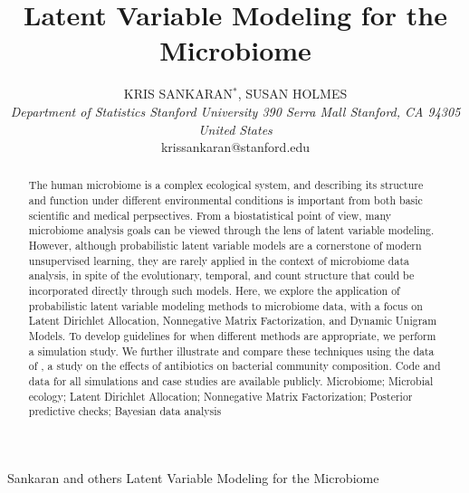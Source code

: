 \documentclass[oupdraft]{bio}
\begin{document}
\title{Latent Variable Modeling for the Microbiome}

\author{
  KRIS SANKARAN$^\ast$, SUSAN HOLMES\\[4pt]
  \textit{
    Department of Statistics
    Stanford University
    390 Serra Mall
    Stanford, CA 94305
    United States
  } \\[2pt]
  {krissankaran@stanford.edu}
}

\markboth
{Sankaran and others}
{Latent Variable Modeling for the Microbiome}

\maketitle


\begin{abstract}
  {
    The human microbiome is a complex ecological system, and describing its
    structure and function under different environmental conditions is important
    from both basic scientific and medical perpsectives. From a biostatistical
    point of view, many microbiome analysis goals can be viewed through the lens
    of latent variable modeling. However, although probabilistic latent variable
    models are a cornerstone of modern unsupervised learning, they are rarely
    applied in the context of microbiome data analysis, in spite of the
    evolutionary, temporal, and count structure that could be incorporated
    directly through such models. Here, we explore the application of
    probabilistic latent variable modeling methods to microbiome data, with a
    focus on Latent Dirichlet Allocation, Nonnegative Matrix Factorization, and
    Dynamic Unigram Models. To develop guidelines for when different methods are
    appropriate, we perform a simulation study. We further illustrate and
    compare these techniques using the data of \citep{dethlefsen2011incomplete},
    a study on the effects of antibiotics on bacterial community composition.
    Code and data for all simulations and case studies are available publicly.}
  {
    Microbiome; Microbial ecology; Latent Dirichlet Allocation; Nonnegative
    Matrix Factorization; Posterior predictive checks; Bayesian data analysis
  }
\end{abstract}
\end{document}
